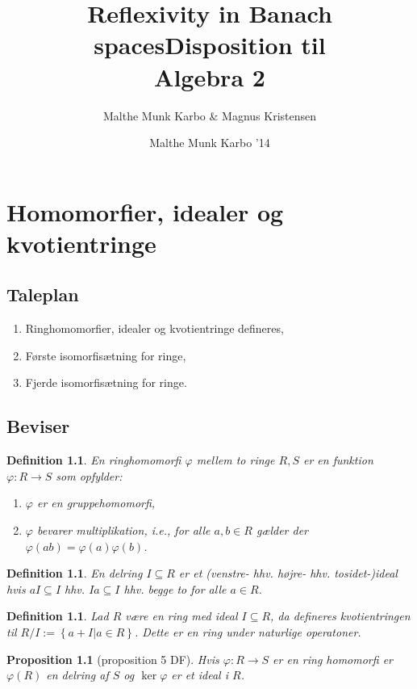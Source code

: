 \documentclass[10pt,twoside,openany,final]{memoir}
\title{Reflexivity in Banach spaces}
\author{Malthe Munk Karbo & Magnus Kristensen}
\title{Disposition til \\\textbf{Algebra 2}}
\author{Malthe Munk Karbo '14}
\theoremstyle{break}
\newtheorem{proposition}[section]{Proposition}
\newtheorem{definition}[section]{Definition}
\theoremstyle{Break}
\begin{document}
\maketitle
\newpage
\tableofcontents*
{}
\chapter{Homomorfier, idealer og kvotientringe}
\section*{Taleplan}
\begin{enumerate}
\item Ringhomomorfier, idealer og kvotientringe defineres,
\item Første isomorfisætning for ringe,
\item Fjerde isomorfisætning for ringe.
\end{enumerate}
\section*{Beviser}
\begin{definition}
En \emph{ringhomomorfi} $\varphi$ mellem to ringe $R,S$ er en funktion $\varphi \colon R \to S$ som opfylder:
\begin{enumerate}
\item $\varphi$ er en gruppehomomorfi,
\item $\varphi$ bevarer multiplikation, i.e., for alle $a,b \in R$ gælder der $\varphi(ab)=\varphi(a)\varphi(b)$.
\end{enumerate}
\end{definition}

\begin{definition}
En delring $I \subseteq R$ er et \emph{(venstre- hhv. højre- hhv. tosidet-)ideal} hvis $aI \subseteq I $ hhv. $Ia \subseteq I$ hhv. begge to for alle $a \in R$.
\end{definition}

\begin{definition}
Lad $R$ være en ring med ideal $I \subseteq R$, da defineres \emph{kvotientringen} til $R / I:=\left\{a+I |  a \in R\right\}$. Dette er en ring under naturlige operatoner. 
\end{definition}

\begin{proposition}[proposition 5 DF]
Hvis $\varphi \colon R \to S$ er en ring homomorfi er $\varphi(R)$ en delring af $S$ og $\ker \varphi$ er et ideal i $R$.
\end{proposition}
\end{document}
